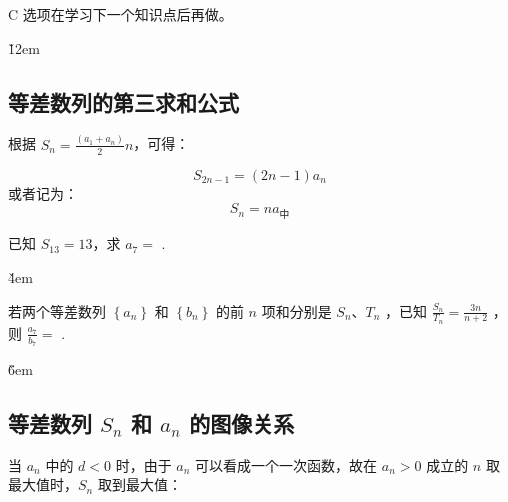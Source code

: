 \begin{tips}
    C 选项在学习下一个知识点后再做。
\end{tips}

\v{12em}

\subsection{等差数列的第三求和公式}

\begin{corollary}[等差数列的第三求和公式]
    根据 $S_n=\frac{(a_1+a_n)}{2}n$，可得：

    $$S_{2n-1}=(2n-1)a_n$$
    或者记为：
    $$S_n = na_{\text{中}}$$
\end{corollary}

\begin{example}[使 $a_n$ 和 $S_n$ 之间相互转化]
    已知 $S_{13}=13$，求 $a_7 = $ \underline{\qquad}.
\end{example}

\v{4em}

\begin{example}
    若两个等差数列 $\left\{a_n\right\}$ 和 $\left\{b_n\right\}$ 的前 $n$ 项和分别是 $S_n$、$T_n$ ，已知 $\frac{S_n}{T_n}=\frac{3 n}{n+2}$ ，则 $\frac{a_7}{b_7}=$ \underline{\qquad}.
\end{example}

\v{6em}

\subsection{等差数列 $S_n$ 和 $a_n$ 的图像关系}

\begin{theorem}[$S_n$ 和 $a_n$ 的图像关系]
    当 $a_n$ 中的 $d<0$ 时，由于 $a_n$ 可以看成一个一次函数，故在 $a_n > 0$ 成立的 $n$ 取最大值时，$S_n$ 取到最大值：
    \begin{center}
    \end{center}
\end{theorem}

